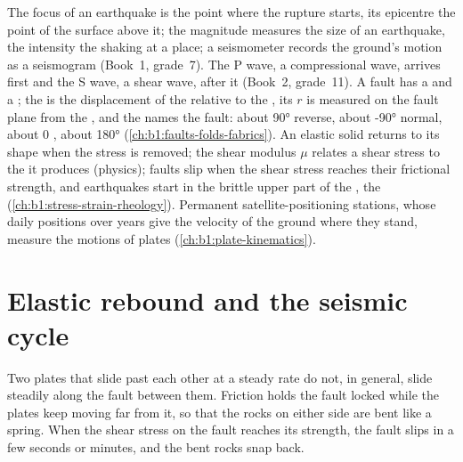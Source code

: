 \begin{recall}
The focus of an earthquake is the point where the rupture starts, its
epicentre the point of the surface above it; the magnitude measures the size
of an earthquake, the intensity the shaking at a place; a seismometer records
the ground's motion as a seismogram (Book~1, grade~7). The P wave, a
compressional wave, arrives first and the S wave, a shear wave, after it
(Book~2, grade~11). A fault has a  and a ; the 
is the displacement of the  relative to the , its 
$r$ is measured on the fault plane from the , and the  names the
fault: about \ang{90} reverse, about \ang{-90} normal, about 0 , about
\ang{180}  (\cref{ch:b1:faults-folds-fabrics}). An elastic solid
returns to its shape when the stress is removed; the shear modulus $\mu$
relates a shear stress to the  it produces (physics); faults slip
when the shear stress reaches their frictional strength, and earthquakes
start in the brittle upper part of the , the 
(\cref{ch:b1:stress-strain-rheology}). Permanent satellite-positioning
stations, whose daily positions over years give the velocity of the ground
where they stand, measure the motions of plates (\cref{ch:b1:plate-kinematics}).
\end{recall}

\section{Elastic rebound and the seismic cycle}\label{sec:b1:earthquake-source:cycle}

Two plates that slide past each other at a steady rate do not, in general,
slide steadily along the fault between them. Friction holds the fault locked
while the plates keep moving far from it, so that the rocks on either side are
bent like a spring. When the shear stress on the fault reaches its strength,
the fault slips in a few seconds or minutes, and the bent rocks snap back.

